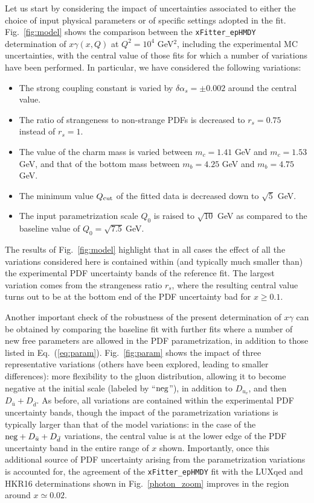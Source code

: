 Let us start by considering the impact of uncertainties associated to either
the choice of input physical parameters or of specific settings
adopted in the fit.
%
Fig.~\ref{fig:model} shows the comparison between the
{\tt xFitter\_epHMDY} 
determination of $x\gamma(x,Q)$ at $Q^2=10^4$ GeV$^2$, including the experimental MC
uncertainties, with the central
value of those fits for which a number of variations have been
performed.
%
In particular, we have considered the following variations:
\begin{itemize}
\item The strong coupling constant is varied by $\delta \alpha_s=\pm 0.002$ around the central value.
\item The ratio of strangeness to non-strange PDFs is decreased to $r_s=0.75$ instead of $r_s=1$.
\item The value of the charm mass is varied between $m_c=1.41$ GeV and $m_c=1.53$ GeV,
  and that of the bottom mass between $m_b=4.25$ GeV and $m_b=4.75$ GeV.
\item The minimum value $Q_{\rm cut}$ of the fitted data is decreased down to $\sqrt{5}$ GeV.
\item The input parametrization scale $Q_0$ is raised to $\sqrt{10}$ GeV as compared
  to the baseline value of $Q_0=\sqrt{7.5}~$GeV.
\end{itemize}
The results of Fig.~\ref{fig:model} highlight that in all cases the effect
of all the variations considered here is contained within (and typically much smaller than) 
the experimental PDF uncertainty bands of the reference fit.
%
The largest variation comes from the strangeness ratio $r_s$, where the resulting
central value turns out to be at the bottom end of the PDF uncertainty bad for $x\ge 0.1$.

Another important check of the robustness of the present determination of
$x\gamma$ can be obtained by comparing the baseline fit with further
fits where a number of new free parameters are allowed in the PDF
parametrization, in addition to those listed in Eq.~(\ref{eq:param}).
%
Fig.~\ref{fig:param} shows the impact of three representative
variations (others have been explored, leading to smaller
differences): more flexibility to the gluon distribution, allowing it
to become negative at the initial scale (labeled by ``${\rm neg}$''), in addition to $D_{u_v}$,
and then $D_{\bar{u}}+D_{\bar{d}}$.
%
As before, all variations are contained within the experimental PDF uncertainty
bands, though the impact of the parametrization variations is typically larger
than that of the model variations: in the case of the
${\rm neg}+D_{\bar{u}}+D_{\bar{d}}$ variations, the central value is
at the lower edge of the PDF uncertainty band in the entire range
of $x$ shown.
%
Importantly, once this additional source of PDF uncertainty arising from the
parametrization variations is accounted for, the agreement of the {\tt xFitter\_epHMDY}
fit 
with the LUXqed and HKR16  determinations
shown in Fig.~\ref{photon_zoom} improves in the
region around $x\simeq 0.02$.

